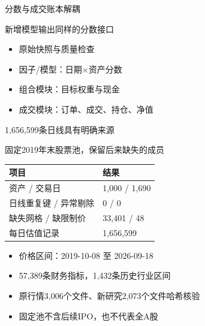 \documentclass[aspectratio=169,10pt]{beamer}
\begin{document}
\begin{frame}{分数与成交账本解耦}
\begin{block}{}新增模型输出同样的分数接口\end{block}
\small\begin{itemize}
\item 原始快照与质量检查
\item 因子/模型：日期$\times$资产分数
\item 组合模块：目标权重与现金
\item 成交模块：订单、成交、持仓、净值
\end{itemize}
\end{frame}

\begin{frame}{1,656,599条日线具有明确来源}
\begin{block}{}固定2019年末股票池，保留后来缺失的成员\end{block}
\begin{center}\small\begin{tabularx}{.96\textwidth}{lX}\toprule
项目 & 结果\\\midrule
资产 / 交易日 & 1,000 / 1,690\\
日线重复键 / 异常剔除 & 0 / 0\\
缺失网格 / 缺限制价 & 33,401 / 48\\
每日估值记录 & 1,656,599\\
\bottomrule\end{tabularx}\end{center}
\small\begin{itemize}
\item 价格区间：2019-10-08 至 2026-09-18
\item 57,389条财务指标，1,432条历史行业区间
\item 原行情3,006个文件、新研究2,073个文件哈希核验
\item 固定池不含后续IPO，也不代表全A股
\end{itemize}
\end{frame}
\end{document}
